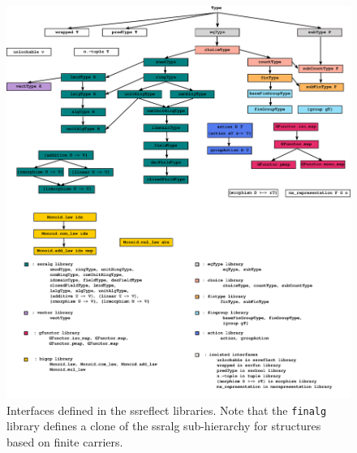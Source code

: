
\newpage

\begin{figure}[!h]
  \begin{center}
      \includegraphics[width=\linewidth]{Figs/classes1}
   \caption{Interfaces defined in the ssreflect
     libraries. Note that the {\tt finalg} library defines a clone of the ssralg
     sub-hierarchy for structures based on finite carriers.}\label{fig:hier}
\end{center}
\end{figure}
